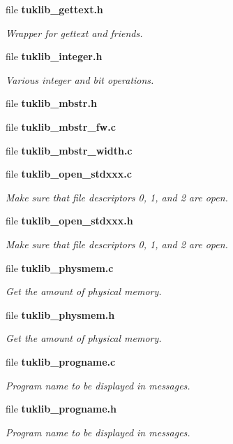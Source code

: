 \begin{DoxyCompactItemize}
file {\bf tuklib\-\_\-gettext.\-h}
\begin{DoxyCompactList}\small\item\em Wrapper for gettext and friends. \end{DoxyCompactList}\item 
file {\bf tuklib\-\_\-integer.\-h}
\begin{DoxyCompactList}\small\item\em Various integer and bit operations. \end{DoxyCompactList}\item 
file {\bfseries tuklib\-\_\-mbstr.\-h}
\item 
file {\bfseries tuklib\-\_\-mbstr\-\_\-fw.\-c}
\item 
file {\bfseries tuklib\-\_\-mbstr\-\_\-width.\-c}
\item 
file {\bf tuklib\-\_\-open\-\_\-stdxxx.\-c}
\begin{DoxyCompactList}\small\item\em Make sure that file descriptors 0, 1, and 2 are open. \end{DoxyCompactList}\item 
file {\bf tuklib\-\_\-open\-\_\-stdxxx.\-h}
\begin{DoxyCompactList}\small\item\em Make sure that file descriptors 0, 1, and 2 are open. \end{DoxyCompactList}\item 
file {\bf tuklib\-\_\-physmem.\-c}
\begin{DoxyCompactList}\small\item\em Get the amount of physical memory. \end{DoxyCompactList}\item 
file {\bf tuklib\-\_\-physmem.\-h}
\begin{DoxyCompactList}\small\item\em Get the amount of physical memory. \end{DoxyCompactList}\item 
file {\bf tuklib\-\_\-progname.\-c}
\begin{DoxyCompactList}\small\item\em Program name to be displayed in messages. \end{DoxyCompactList}\item 
file {\bf tuklib\-\_\-progname.\-h}
\begin{DoxyCompactList}\small\item\em Program name to be displayed in messages. \end{DoxyCompactList}\end{DoxyCompactItemize}
